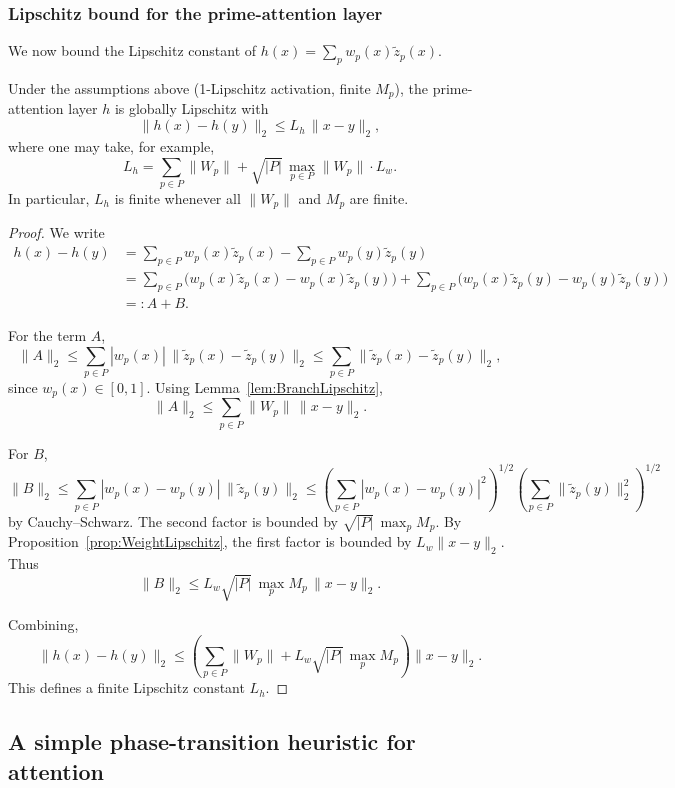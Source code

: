 \documentclass[11pt]{article}
\begin{document}
\subsubsection{Lipschitz bound for the prime-attention layer}

We now bound the Lipschitz constant of $h(x) = \sum_p w_p(x)\tilde{z}_p(x)$.

\begin{theorem}
\label{thm:LayerLipschitz}
Under the assumptions above (1-Lipschitz activation, finite $M_p$), the prime-attention layer $h$ is globally Lipschitz with
\[
\|h(x)-h(y)\|_2 \le L_h \,\|x-y\|_2,
\]
where one may take, for example,
\[
L_h = \sum_{p\in P} \|W_p\| + \sqrt{|P|}\,\max_{p\in P}\|W_p\| \cdot L_w.
\]
In particular, $L_h$ is finite whenever all $\|W_p\|$ and $M_p$ are finite.
\end{theorem}

\begin{proof}
We write
\begin{align*}
h(x) - h(y)
&= \sum_{p\in P} w_p(x)\tilde{z}_p(x) - \sum_{p\in P} w_p(y)\tilde{z}_p(y)\\
&= \sum_{p\in P} \big( w_p(x)\tilde{z}_p(x) - w_p(x)\tilde{z}_p(y)\big)
 + \sum_{p\in P} \big( w_p(x)\tilde{z}_p(y) - w_p(y)\tilde{z}_p(y)\big)\\
&=: A + B.
\end{align*}

For the term $A$,
\[
\|A\|_2 \le \sum_{p\in P} |w_p(x)|\,\|\tilde{z}_p(x)-\tilde{z}_p(y)\|_2
\le \sum_{p\in P} \|\tilde{z}_p(x)-\tilde{z}_p(y)\|_2,
\]
since $w_p(x)\in[0,1]$. Using Lemma~\ref{lem:BranchLipschitz},
\[
\|A\|_2 \le \sum_{p\in P} \|W_p\|\,\|x-y\|_2.
\]

For $B$,
\[
\|B\|_2 \le \sum_{p\in P} |w_p(x)-w_p(y)|\,\|\tilde{z}_p(y)\|_2
\le \left(\sum_{p\in P} |w_p(x)-w_p(y)|^2\right)^{1/2}
     \left(\sum_{p\in P} \|\tilde{z}_p(y)\|_2^2\right)^{1/2}
\]
by Cauchy--Schwarz. The second factor is bounded by $\sqrt{|P|}\,\max_p M_p$. By Proposition~\ref{prop:WeightLipschitz}, the first factor is bounded by $L_w\|x-y\|_2$. Thus
\[
\|B\|_2 \le L_w \sqrt{|P|}\,\max_p M_p \,\|x-y\|_2.
\]

Combining,
\[
\|h(x)-h(y)\|_2 \le \left(\sum_{p\in P} \|W_p\| + L_w\sqrt{|P|}\,\max_p M_p\right)\|x-y\|_2.
\]
This defines a finite Lipschitz constant $L_h$.
\end{proof}

\subsection{A simple phase-transition heuristic for attention}
\end{document}
